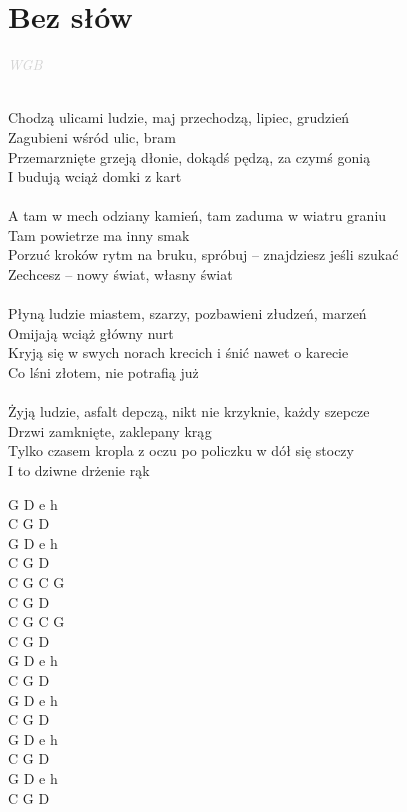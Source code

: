 \documentclass[a5paper, 10pt]{book}
\begin{document}
\section{Bez słów}\textcolor{lightgray}{\textit{WGB}}\\~\\
\begin{minipage}[t]{0.85\textwidth}
Chodzą ulicami ludzie, maj przechodzą, lipiec, grudzień\\
Zagubieni wśród ulic, bram\\
Przemarznięte grzeją dłonie, dokądś pędzą, za czymś gonią\\
I budują wciąż domki z kart\\
\\
\hspace*{5mm}A tam w mech odziany kamień, tam zaduma w wiatru graniu\\
\hspace*{5mm}Tam powietrze ma inny smak\\
\hspace*{5mm}Porzuć kroków rytm na bruku, spróbuj – znajdziesz jeśli szukać\\
\hspace*{5mm}Zechcesz – nowy świat, własny świat\\
\\
Płyną ludzie miastem, szarzy, pozbawieni złudzeń, marzeń\\
Omijają wciąż główny nurt\\
Kryją się w swych norach krecich i śnić nawet o karecie\\
Co lśni złotem, nie potrafią już\\
\\
Żyją ludzie, asfalt depczą, nikt nie krzyknie, każdy szepcze\\
Drzwi zamknięte, zaklepany krąg\\
Tylko czasem kropla z oczu po policzku w dół się stoczy\\
I to dziwne drżenie rąk\\
\end{minipage}
\begin{minipage}[t]{0.2\textwidth}
G D e h\\
C G D\\
G D e h\\
C G D\\

C G C G\\
C G D\\
C G C G\\
C G D\\

G D e h\\
C G D\\
G D e h\\
C G D\\

G D e h\\
C G D\\
G D e h\\
C G D\\
\end{minipage}
\end{document}
